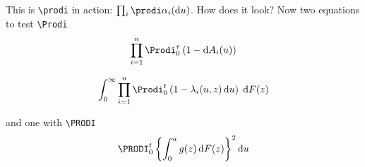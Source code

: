 \documentclass{article}
\def\d{\mathrm{d}}
\begin{document}
This is \verb+\prodi+ in action: $\prod_i\prodi\alpha_i(\d u)$. How does it look?
\bigskip
Now two equations to test \verb+\Prodi+
\[ 
\prod_{i=1}^n\Prodi_0^\tau \left(1-\d A_i(u)\right) 
\]

\[
\int_0^\infty \prod_{i=1}^n\Prodi_0^t\left(1-\lambda_i(u,z)\,\d u\right)\;\d F(z)\]

\bigskip
and one with \verb+\PRODI+
\[ \PRODI_0^t \left\{\int_0^u g(z)\,\d F(z)\right\}^2 \d u
\]
\end{document}
